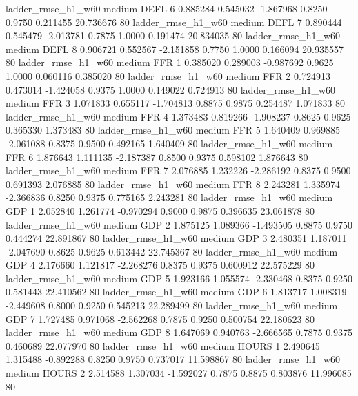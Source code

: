     ladder_rmse_h1_w60     medium     DEFL                 6  0.885284 0.545032 -1.867968 0.8250 0.9750  0.211455   20.736676 80
    ladder_rmse_h1_w60     medium     DEFL                 7  0.890444 0.545479 -2.013781 0.7875 1.0000  0.191474   20.834035 80
    ladder_rmse_h1_w60     medium     DEFL                 8  0.906721 0.552567 -2.151858 0.7750 1.0000  0.166094   20.935557 80
    ladder_rmse_h1_w60     medium      FFR                 1  0.385020 0.289003 -0.987692 0.9625 1.0000  0.060116    0.385020 80
    ladder_rmse_h1_w60     medium      FFR                 2  0.724913 0.473014 -1.424058 0.9375 1.0000  0.149022    0.724913 80
    ladder_rmse_h1_w60     medium      FFR                 3  1.071833 0.655117 -1.704813 0.8875 0.9875  0.254487    1.071833 80
    ladder_rmse_h1_w60     medium      FFR                 4  1.373483 0.819266 -1.908237 0.8625 0.9625  0.365330    1.373483 80
    ladder_rmse_h1_w60     medium      FFR                 5  1.640409 0.969885 -2.061088 0.8375 0.9500  0.492165    1.640409 80
    ladder_rmse_h1_w60     medium      FFR                 6  1.876643 1.111135 -2.187387 0.8500 0.9375  0.598102    1.876643 80
    ladder_rmse_h1_w60     medium      FFR                 7  2.076885 1.232226 -2.286192 0.8375 0.9500  0.691393    2.076885 80
    ladder_rmse_h1_w60     medium      FFR                 8  2.243281 1.335974 -2.366836 0.8250 0.9375  0.775165    2.243281 80
    ladder_rmse_h1_w60     medium      GDP                 1  2.052840 1.261774 -0.970294 0.9000 0.9875  0.396635   23.061878 80
    ladder_rmse_h1_w60     medium      GDP                 2  1.875125 1.089366 -1.493505 0.8875 0.9750  0.444274   22.891867 80
    ladder_rmse_h1_w60     medium      GDP                 3  2.480351 1.187011 -2.047690 0.8625 0.9625  0.613442   22.745367 80
    ladder_rmse_h1_w60     medium      GDP                 4  2.176660 1.121817 -2.268276 0.8375 0.9375  0.600912   22.575229 80
    ladder_rmse_h1_w60     medium      GDP                 5  1.923166 1.055574 -2.330468 0.8375 0.9250  0.581443   22.410562 80
    ladder_rmse_h1_w60     medium      GDP                 6  1.813717 1.008319 -2.449608 0.8000 0.9250  0.545213   22.289499 80
    ladder_rmse_h1_w60     medium      GDP                 7  1.727485 0.971068 -2.562268 0.7875 0.9250  0.500754   22.180623 80
    ladder_rmse_h1_w60     medium      GDP                 8  1.647069 0.940763 -2.666565 0.7875 0.9375  0.460689   22.077970 80
    ladder_rmse_h1_w60     medium    HOURS                 1  2.490645 1.315488 -0.892288 0.8250 0.9750  0.737017   11.598867 80
    ladder_rmse_h1_w60     medium    HOURS                 2  2.514588 1.307034 -1.592027 0.7875 0.8875  0.803876   11.996085 80
